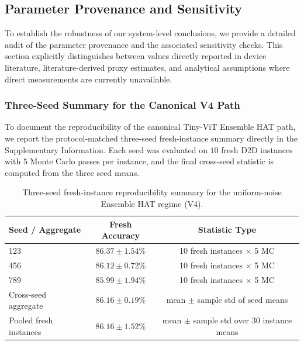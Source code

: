 \subsection{Parameter Provenance and Sensitivity}
\label{subsec:parameter-provenance}

To establish the robustness of our system-level conclusions, we provide a detailed audit of the parameter provenance and the associated sensitivity checks. This section explicitly distinguishes between values directly reported in device literature, literature-derived proxy estimates, and analytical assumptions where direct measurements are currently unavailable.

\subsubsection{Three-Seed Summary for the Canonical V4 Path}

To document the reproducibility of the canonical Tiny-ViT Ensemble HAT path, we report the protocol-matched three-seed fresh-instance summary directly in the Supplementary Information. Each seed was evaluated on \(10\) fresh D2D instances with \(5\) Monte Carlo passes per instance, and the final cross-seed statistic is computed from the three seed means.

\begin{table}[ht]
\centering
\caption{Three-seed fresh-instance reproducibility summary for the uniform-noise Ensemble HAT regime (V4).}
\label{tab:v4-three-seed-summary}
\begin{tabular}{lcc}
\toprule
\textbf{Seed / Aggregate} & \textbf{Fresh Accuracy} & \textbf{Statistic Type} \\
\midrule
123 & \(86.37\pm1.54\)\% & 10 fresh instances \(\times\) 5 MC \\
456 & \(86.12\pm0.72\)\% & 10 fresh instances \(\times\) 5 MC \\
789 & \(85.99\pm1.94\)\% & 10 fresh instances \(\times\) 5 MC \\
\midrule
Cross-seed aggregate & \(\mathbf{86.16\pm0.19}\)\% & mean \(\pm\) sample std of seed means \\
Pooled fresh instances & \(86.16\pm1.52\)\% & mean \(\pm\) sample std over 30 instance means \\
\bottomrule
\end{tabular}
\end{table}

\FloatBarrier

